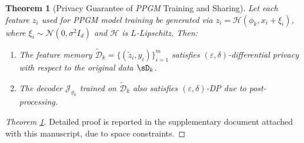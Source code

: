 \documentclass[lettersize,journal]{IEEEtran}
\newtheorem{theorem}{Theorem}
\newtheorem{proof}{Proof}
\begin{document}
\begin{theorem}[Privacy Guarantee of \emph{PPGM} Training and Sharing]
\label{theo:4}
Let each feature $z_i$ used for \emph{PPGM} model training be generated via $z_i = \mathcal{H}( \phi_k, x_i + \xi_i)$, where $\xi_i \sim \mathcal{N}(0, \sigma^2 I_d)$ and $\mathcal{H}$ is $L$-Lipschitz. Then:

\begin{enumerate}
    \item The feature memory $\tilde{\mathcal{D}}_k = \{(\tilde{z}_i, y_i)\}_{i=1}^m$ satisfies $(\varepsilon, \delta)$-differential privacy with respect to the original data $\sD_k$.
    \item The decoder $\mathcal{J}_{\varrho_k}$ trained on $\tilde{\mathcal{D}}_k$ also satisfies $(\varepsilon, \delta)$-DP due to post-processing.
\end{enumerate}
\end{theorem}

\begin{proof}[Theorem \ref{theo:4}]
Detailed proof is reported in the supplementary document attached with this manuscript, due to space constraints.





\end{proof}
\end{document}
